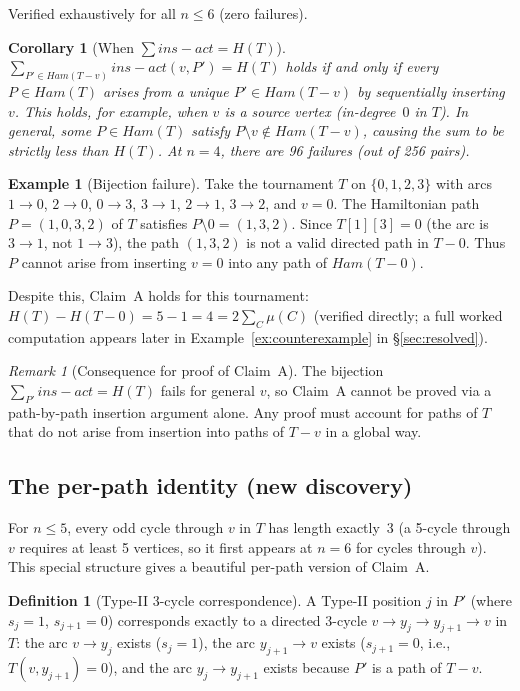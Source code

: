 \documentclass[12pt,reqno]{amsart}
\theoremstyle{plain}
\newtheorem{corollary}[theorem]{Corollary}
\theoremstyle{definition}
\newtheorem{definition}[theorem]{Definition}
\newtheorem{example}[theorem]{Example}
\theoremstyle{remark}
\newtheorem{remark}[theorem]{Remark}
\newcommand{\Ham}{\mathrm{Ham}}
\newcommand{\insact}{\mathrm{ins}_{\mathrm{act}}}
\renewcommand{\Ham}{Ham}%
\renewcommand{\insact}{ins-act}%
\begin{document}
\noindent Verified exhaustively for all $n \leq 6$ (zero failures).

\begin{corollary}[When $\sum \insact = H(T)$]\label{cor:insertion_bijection}
$\sum_{P' \in \Ham(T{-}v)} \insact(v,P') = H(T)$ holds if and only if
every $P \in \Ham(T)$ arises from a unique $P' \in \Ham(T{-}v)$ by sequentially
inserting $v$. This holds, for example, when $v$ is a source vertex
(in-degree~$0$ in $T$). In general, some $P \in \Ham(T)$ satisfy
$P \setminus v \notin \Ham(T{-}v)$, causing the sum to be strictly less than
$H(T)$. At $n=4$, there are 96 failures (out of 256 pairs).
\end{corollary}

\begin{example}[Bijection failure]\label{ex:bijection_failure}
Take the tournament $T$ on $\{0,1,2,3\}$ with arcs
$1{\to}0$, $2{\to}0$, $0{\to}3$, $3{\to}1$, $2{\to}1$, $3{\to}2$, and $v=0$.
The Hamiltonian path $P=(1,0,3,2)$ of $T$ satisfies $P{\setminus}0 = (1,3,2)$.
Since $T[1][3]=0$ (the arc is $3{\to}1$, not $1{\to}3$), the path $(1,3,2)$
is not a valid directed path in $T{-}0$. Thus $P$ cannot arise from inserting
$v=0$ into any path of $\Ham(T{-}0)$.

Despite this, Claim~A holds for this tournament: $H(T)-H(T{-}0)=5-1=4=2\sum_C\mu(C)$
(verified directly; a full worked computation appears later in
Example~\ref{ex:counterexample} in \S\ref{sec:resolved}).
\end{example}

\begin{remark}[Consequence for proof of Claim~A]
The bijection $\sum_{P'} \insact = H(T)$ fails for general $v$,
so Claim~A cannot be proved via a path-by-path insertion argument alone.
Any proof must account for paths of $T$ that do not arise from
insertion into paths of $T{-}v$ in a global way.
\end{remark}

\subsection{The per-path identity (new discovery)}
\label{sec:perpath}

For $n \leq 5$, every odd cycle through $v$ in $T$ has length exactly~3
(a 5-cycle through $v$ requires at least 5 vertices, so it first appears at $n=6$
for cycles through $v$). This special structure gives a beautiful per-path
version of Claim~A.

\begin{definition}[Type-II 3-cycle correspondence]\label{def:typeII_3cycle}
A Type-II position $j$ in $P'$ (where $s_j=1$, $s_{j+1}=0$) corresponds exactly
to a directed 3-cycle $v \to y_j \to y_{j+1} \to v$ in $T$: the arc $v \to y_j$
exists ($s_j = 1$), the arc $y_{j+1} \to v$ exists ($s_{j+1} = 0$, i.e.,
$T(v,y_{j+1})=0$), and the arc $y_j \to y_{j+1}$ exists because $P'$ is a path
of $T{-}v$.
\end{definition}
\end{document}
